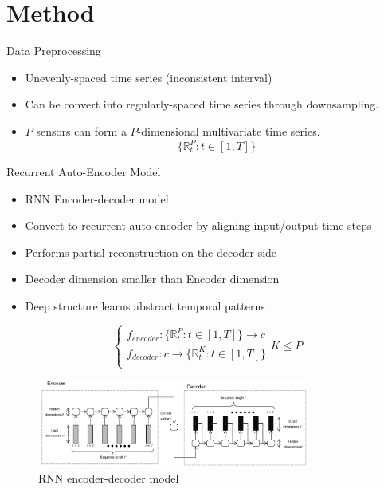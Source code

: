 \documentclass{beamer}
\begin{document}
\section{Method}

\begin{frame}{Data Preprocessing}
  \begin{itemize}
    \item Unevenly-spaced time series (inconsistent interval)
    \item Can be convert into regularly-spaced time series through downsampling.
    \item \(P\) sensors can form a \(P\)-dimensional multivariate time series.
    \[ \{ \mathbb{R}_t^P:t\in [1,T] \} \]
  \end{itemize}
\end{frame}


\begin{frame}[shrink]{Recurrent Auto-Encoder Model}
  \begin{itemize}
    \item RNN Encoder-decoder model
    \item Convert to recurrent auto-encoder by aligning input/output time steps
    \item Performs partial reconstruction on the decoder side
    \item Decoder dimension smaller than Encoder dimension
    \item Deep structure learns abstract temporal patterns
  \end{itemize}
  \[
    \begin{cases} 
      f_{encoder} : \{ \mathbb{R}_t^P:t \in [1, T] \} \rightarrow c \\
      f_{decoder} : c \rightarrow \{ \mathbb{R}_t^K:t \in [1, T] \} \\
    \end{cases} K \leqslant P
  \]
  \begin{figure}
    \centering
    \includegraphics[width=0.8\textwidth]{seq2seq.PNG}
    \caption{RNN encoder-decoder model}
  \end{figure}
\end{frame}
\end{document}
